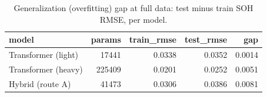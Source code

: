\begin{table}
\caption{Generalization (overfitting) gap at full data: test minus train SOH RMSE, per model.}
\label{tab:ablation_overfitting_gap}
\begin{tabular}{lrrrr}
\toprule
model & params & train\_rmse & test\_rmse & gap \\
\midrule
Transformer (light) & 17441 & 0.0338 & 0.0352 & 0.0014 \\
Transformer (heavy) & 225409 & 0.0201 & 0.0252 & 0.0051 \\
Hybrid (route A) & 41473 & 0.0306 & 0.0386 & 0.0081 \\
\bottomrule
\end{tabular}
\end{table}
